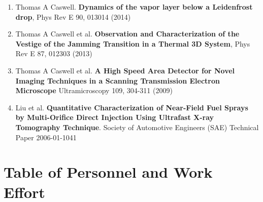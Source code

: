 \documentclass[12pt]{article}
\numberwithin{page}{section}
\begin{document}
\begin{enumerate}[noitemsep]
  \item Thomas A Caswell. \textbf{Dynamics of the vapor layer below a
    Leidenfrost drop}, Phys Rev E 90, 013014 (2014)

  \item Thomas A Caswell et al. \textbf{Observation and
    Characterization of the Vestige of the Jamming Transition in a
    Thermal 3D System}, Phys Rev E 87, 012303 (2013)

  \item Thomas A Caswell et al. \textbf{A High Speed Area
    Detector for Novel Imaging Techniques in a Scanning Transmission
    Electron Microscope} Ultramicroscopy 109, 304-311 (2009)

  \item Liu et al. \textbf{Quantitative Characterization of Near-Field Fuel
    Sprays by Multi-Orifice Direct Injection Using Ultrafast X-ray Tomography Technique}.
    Society of Automotive Engineers (SAE) Technical Paper 2006-01-1041

\end{enumerate}

\newpage
\section{Table of Personnel and Work Effort}
\setcounter{page}{1}
\end{document}
